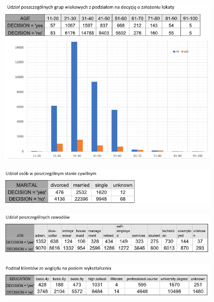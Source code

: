 \documentclass[12pt,a4paper]{article}
\begin{document}
\begin{figure}[H]
	\centering
	\includegraphics[scale=0.65]{data_2.png}
\end{figure}

\begin{figure}[H]
	\centering
	\includegraphics[scale=0.65]{data_3.png}
\end{figure}

\begin{figure}[H]
	\centering
	\includegraphics[scale=0.65]{data_4.png}
\end{figure}

\begin{figure}[H]
	\centering
	\includegraphics[scale=0.65]{data_5.png}
\end{figure}
\end{document}
